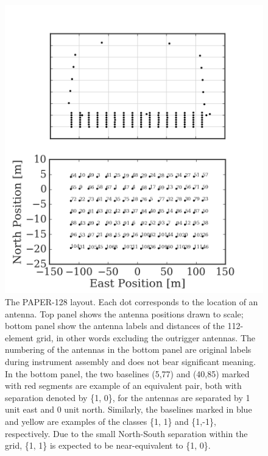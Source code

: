 \documentclass[twocolumn,apj,numberedappendix]{emulateapj}
\renewcommand\[{\begin{equation}}
\renewcommand\]{\end{equation}}
\begin{document}
\begin{figure}[H]
\includegraphics[width=\linewidth]{antpos128}

\caption{The PAPER-128 layout. Each dot corresponds to the location of
an antenna. Top panel shows the antenna positions drawn to scale;
bottom panel show the antenna labels and distances of the 112-element grid, in other words excluding the outrigger antennas.
The numbering of the antennas in the bottom panel are original labels
during instrument assembly and does not bear significant
meaning. In the bottom panel, the two baselines (5,77) and (40,85) marked with red segments are example of an equivalent pair, both with separation denoted by \{1, 0\}, for the
antennas are separated by 1 unit east and 0 unit north. Similarly,
the baselines marked in blue and yellow are examples
of the classes \{1, 1\} and \{1,-1\}, respectively. Due to the small North-South separation within the grid, \{1, 1\} is expected to be near-equivalent to \{1, 0\}. }
\label{fig:AntPos}
\end{figure}
\end{document}
